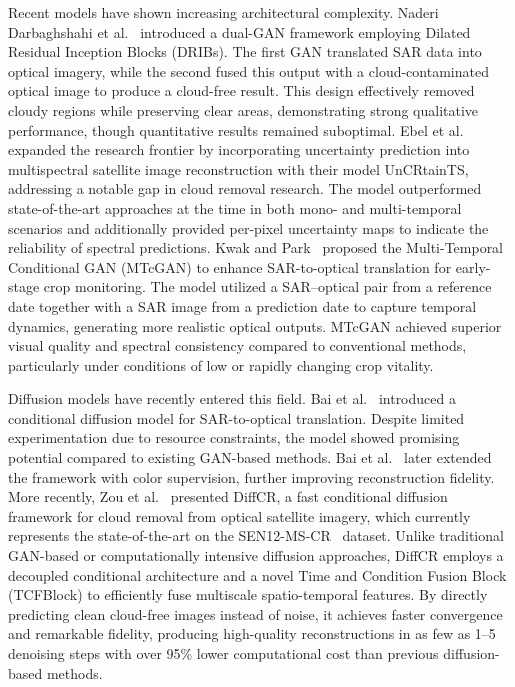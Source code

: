 Recent models have shown increasing architectural complexity. Naderi Darbaghshahi et al.~\cite{naderi2021} introduced a dual-GAN framework employing Dilated Residual Inception Blocks (DRIBs). The first GAN translated SAR data into optical imagery, while the second fused this output with a cloud-contaminated optical image to produce a cloud-free result. This design effectively removed cloudy regions while preserving clear areas, demonstrating strong qualitative performance, though quantitative results remained suboptimal.
Ebel et al.~\cite{UnCRtainTS} expanded the research frontier by incorporating uncertainty prediction into multispectral satellite image reconstruction with their model UnCRtainTS, addressing a notable gap in cloud removal research. The model outperformed state-of-the-art approaches at the time in both mono- and multi-temporal scenarios and additionally provided per-pixel uncertainty maps to indicate the reliability of spectral predictions.
Kwak and Park~\cite{assessing_MT_cGANS_s2o_crop} proposed the Multi-Temporal Conditional GAN (MTcGAN) to enhance SAR-to-optical translation for early-stage crop monitoring. The model utilized a SAR–optical pair from a reference date together with a SAR image from a prediction date to capture temporal dynamics, generating more realistic optical outputs. MTcGAN achieved superior visual quality and spectral consistency compared to conventional methods, particularly under conditions of low or rapidly changing crop vitality.

Diffusion models have recently entered this field. Bai et al.~\cite{c_diffusion_s2o} introduced a conditional diffusion model for SAR-to-optical translation. Despite limited experimentation due to resource constraints, the model showed promising potential compared to existing GAN-based methods. Bai et al.~\cite{s2o_color_super_diff} later extended the framework with color supervision, further improving reconstruction fidelity. More recently, Zou et al.~\cite{DiffCR} presented DiffCR, a fast conditional diffusion framework for cloud removal from optical satellite imagery, which currently represents the state-of-the-art on the SEN12-MS-CR~\cite{sen12ms-cr_2021} dataset. Unlike traditional GAN-based or computationally intensive diffusion approaches, DiffCR employs a decoupled conditional architecture and a novel Time and Condition Fusion Block (TCFBlock) to efficiently fuse multiscale spatio-temporal features. By directly predicting clean cloud-free images instead of noise, it achieves faster convergence and remarkable fidelity, producing high-quality reconstructions in as few as 1–5 denoising steps with over 95\% lower computational cost than previous diffusion-based methods.

